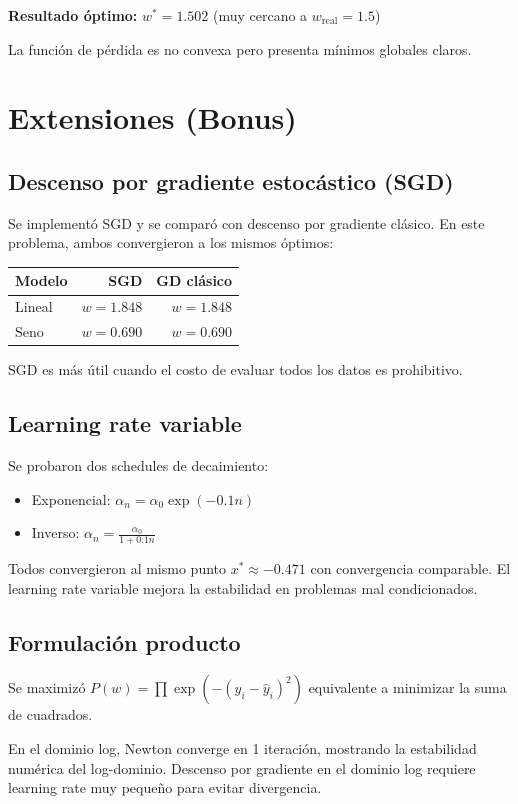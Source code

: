 \documentclass[12pt,a4paper]{article}
\begin{document}
\textbf{Resultado óptimo:} $w^* = 1.502$ (muy cercano a $w_{\text{real}} = 1.5$)

La función de pérdida es no convexa pero presenta mínimos globales claros.

\section{Extensiones (Bonus)}
\subsection{Descenso por gradiente estocástico (SGD)}
Se implementó SGD y se comparó con descenso por gradiente clásico. En este problema, ambos convergieron a los mismos óptimos:
\begin{center}
\begin{tabular}{lrr}
\toprule
Modelo & SGD & GD clásico \\
\midrule
Lineal & $w=1.848$ & $w=1.848$ \\
Seno & $w=0.690$ & $w=0.690$ \\
\bottomrule
\end{tabular}
\end{center}

SGD es más útil cuando el costo de evaluar todos los datos es prohibitivo.

\subsection{Learning rate variable}
Se probaron dos schedules de decaimiento:
\begin{itemize}
    \item Exponencial: $\alpha_n = \alpha_0 \exp(-0.1n)$
    \item Inverso: $\alpha_n = \frac{\alpha_0}{1+0.1n}$
\end{itemize}

Todos convergieron al mismo punto $x^* \approx -0.471$ con convergencia comparable. El learning rate variable mejora la estabilidad en problemas mal condicionados.

\subsection{Formulación producto}
Se maximizó $P(w) = \prod \exp(-(y_i-\hat{y}_i)^2)$ equivalente a minimizar la suma de cuadrados.

En el dominio log, Newton converge en 1 iteración, mostrando la estabilidad numérica del log-dominio. Descenso por gradiente en el dominio log requiere learning rate muy pequeño para evitar divergencia.
\end{document}
